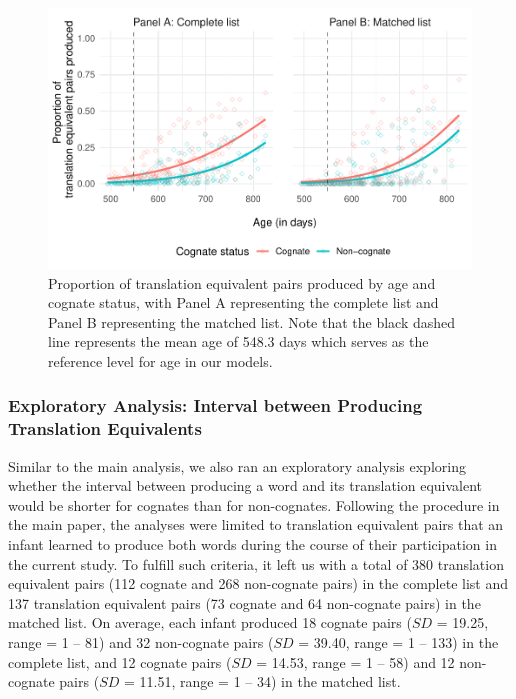\documentclass[
  ,man,floatsintext]{apa6}
\begin{document}
\begin{figure}

{\centering \includegraphics[width=1.2\linewidth]{CogVocab_supplemental_files/figure-latex/FigS2-1} 

}

\caption{Proportion of translation equivalent pairs produced by age and cognate status, with Panel A representing the complete list and Panel B representing the matched list. Note that the black dashed line represents the mean age of 548.3 days which serves as the reference level for age in our models.}\label{fig:FigS2}
\end{figure}

\hypertarget{exploratory-analysis-interval-between-producing-translation-equivalents}{%
\subsubsection{Exploratory Analysis: Interval between Producing Translation Equivalents}\label{exploratory-analysis-interval-between-producing-translation-equivalents}}

Similar to the main analysis, we also ran an exploratory analysis exploring whether the interval between producing a word and its translation equivalent would be shorter for cognates than for non-cognates. Following the procedure in the main paper, the analyses were limited to translation equivalent pairs that an infant learned to produce both words during the course of their participation in the current study. To fulfill such criteria, it left us with a total of 380 translation equivalent pairs (112 cognate and 268 non-cognate pairs) in the complete list and 137 translation equivalent pairs (73 cognate and 64 non-cognate pairs) in the matched list. On average, each infant produced 18 cognate pairs (\(SD\) = 19.25, range = 1 -- 81) and 32 non-cognate pairs (\(SD\) = 39.40, range = 1 -- 133) in the complete list, and 12 cognate pairs (\(SD\) = 14.53, range = 1 -- 58) and 12 non-cognate pairs (\(SD\) = 11.51, range = 1 -- 34) in the matched list.
\end{document}
